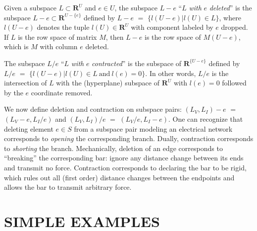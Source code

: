 \documentclass{article}
\def\Reals{\ensuremath{\mathbf R}}
\begin{document}
Given a subspace $L\subset\Reals^U$ and $e\in U$, the subspace $L-e$ 
``$L$ \textit{with} $e$ \textit{deleted}'' is the
subspace $L-e\subset\Reals^{U-\{e\}}$ defined by $L-e$ $=$
$\{ l(U-e) | l(U)\in L\}$, where $l(U-e)$ denotes the tuple $l(U)\in\Reals^U$
with component labeled by $e$ dropped.  If $L$ is the row space of matrix $M$,
then $L-e$ is the row space of $M(U-e)$, which is $M$ with column $e$ deleted.

The subspace $L/e$ ``$L$ \textit{with} $e$ \textit{contracted}'' is the 
subspace
of $\Reals^{\{U-e\}}$ defined by 
$L/e$ $=$
$\{ l(U-e) | l(U)\in L \mathrm{\ and\ } l(e)=0\}$.  
In other words, $L/e$ is the 
intersection of $L$ with
the (hyperplane) subspace of $\Reals^U$ with $l(e)=0$ followed by the $e$ 
coordinate removed.  

We now define deletion and contraction on subspace pairs:  
$(L_V, L_I)-e$ $=$ $(L_V-e, L_I/e)$ and 
$(L_V, L_I)/e$ $=$ $(L_V/e, L_I-e)$.  One can recognize that 
deleting element $e\in S$ from a subspace pair modeling an electrical network
corresponds to \textit{opening} the corresponding branch.  Dually, 
contraction corresponds to \textit{shorting} the branch.  Mechanically,
deletion of an edge corresponds to ``breaking'' the corresponding bar:
ignore any distance change between its ends and transmit no force.
Contraction corresponds to 
declaring the bar to be rigid, which rules out 
all (first order) distance changes between the endpoints and allows 
the bar 
to transmit arbitrary force.

\section{SIMPLE EXAMPLES}
\end{document}
